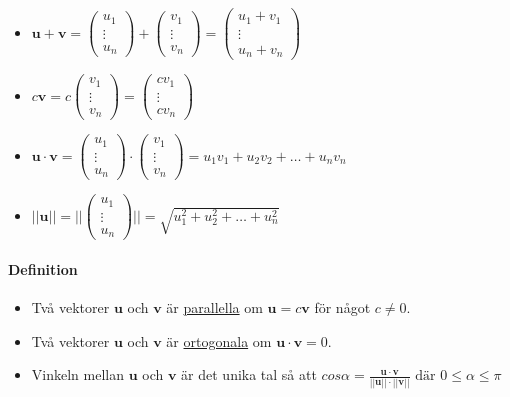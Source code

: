 \begin{itemize}
    \item[] 
        $\bm{u}+\bm{v}=
        \begin{pmatrix}
            u_{1}\\
            \vdots\\
            u_{n}
        \end{pmatrix}
            +
        \begin{pmatrix}
            v_{1}\\
            \vdots\\
            v_{n}
        \end{pmatrix}
        =
        \begin{pmatrix}
            u_{1}+v_{1}\\
            \vdots\\
            u_{n}+v_{n}
        \end{pmatrix}$
    \item[] $c\bm{v}=c\begin{pmatrix}
        v_{1}\\
        \vdots\\
        v_{n}
    \end{pmatrix}=\begin{pmatrix}
        cv_{1}\\
        \vdots\\
        cv_{n}
    \end{pmatrix}$
    \item[] $\bm{u}\cdot \bm{v}=\begin{pmatrix}u_{1}\\\vdots\\u_{n}\end{pmatrix}\cdot\begin{pmatrix}v_{1}\\\vdots\\v_{n}\end{pmatrix}= u_{1}v_{1}+u_{2}v_{2}+\ldots+u_{n}v_{n}$
    \item[] $||\bm{u}||=||\begin{pmatrix}u_{1}\\\vdots\\u_{n}\end{pmatrix}||=\sqrt{u_{1}^{2}+u_{2}^{2}+\ldots+u_{n}^{2}}$
\end{itemize}
\paragraph{Definition} 
\begin{itemize}
    \item[] Två vektorer $\bm{u}$ och $\bm{v}$ är \underline{parallella} om $\bm{u}=c\bm{v}$ för något $c\neq 0$.
    \item[] Två vektorer $\bm{u}$ och $\bm{v}$ är \underline{ortogonala} om $\bm{u}\cdot \bm{v}=0$.
    \item[] Vinkeln mellan $\bm{u}$ och $\bm{v}$ är det unika tal så att $cos\alpha=\frac{\bm{u}\cdot \bm{v}}{||\bm{u}||\cdot ||\bm{v}||}\text{ där } 0\leq \alpha \leq \pi$
\end{itemize}

